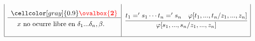 \documentclass[a4paper, 10pt]{article}
\begin{document}
\begin{equation*}
\begin{array}{|c|c|c|c|c|}
\begin{array}{c}
\cellcolor[gray]{0.9}\textcolor{red}{\ovalbox{\textbf{2}}} \\ \hline \parbox[c][2em][c]{140px}{\text{$x$ no ocurre libre en $\delta_1 ... \delta_n, \beta$.}} \\
\end{array}
\hspace*{-1ex}
&
\begin{matrix}
  \\
  \cfrac{\begin{matrix} t_1 =' s_1 \cdots t_n =' s_n & \varphi[t_1, ... , t_n / z_1 , ... , z_n]\end{matrix}}{\varphi[s_1, ... , s_n / z_1 , ... , z_n]} \\ 
  \\
\end{matrix}
\\ \hline
\end{array}
\end{equation*}
\end{document}
